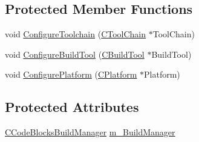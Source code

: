 \subsection*{Protected Member Functions}
\begin{DoxyCompactItemize}
\item 
void \hyperlink{classCProcessingMachine_ad02c48691791890fd51d4d3213c264b5}{Configure\-Toolchain} (\hyperlink{classCToolChain}{C\-Tool\-Chain} $\ast$Tool\-Chain)
\item 
void \hyperlink{classCProcessingMachine_a93e863bd0c7e4dbdb36ae67f8705ec30}{Configure\-Build\-Tool} (\hyperlink{classCBuildTool}{C\-Build\-Tool} $\ast$Build\-Tool)
\item 
void \hyperlink{classCProcessingMachine_a6357b319f9fdebb9a96cd2296d1d5d17}{Configure\-Platform} (\hyperlink{classCPlatform}{C\-Platform} $\ast$Platform)
\end{DoxyCompactItemize}
\subsection*{Protected Attributes}
\begin{DoxyCompactItemize}
\item 
\hyperlink{classCCodeBlocksBuildManager}{C\-Code\-Blocks\-Build\-Manager} \hyperlink{classCProcessingMachine_a187c1e135672d8bf61111bec078c6176}{m\-\_\-\-Build\-Manager}
\end{DoxyCompactItemize}


